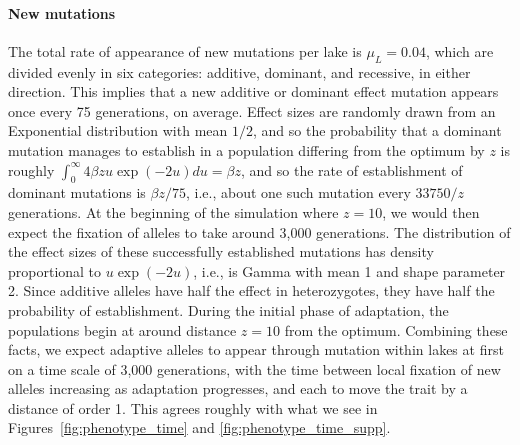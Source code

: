 \documentclass{article}
\begin{document}
\paragraph{New mutations}
The total rate of appearance of new mutations per lake is $\mu_L = 0.04$, 
which are divided evenly in six categories: additive, dominant, and recessive, in either direction. 
This implies that a new additive or dominant effect mutation appears once every 75 generations, on average. 
Effect sizes are randomly drawn from an Exponential distribution with mean $1/2$, 
and so the probability that a dominant mutation manages to establish in a population differing from the optimum by $z$ 
is roughly $\int_0^\infty 4 \beta z u \exp(-2u) du = \beta z$, 
and so the rate of establishment of dominant mutations is $\beta z / 75$, 
i.e., about one such mutation every $33750/z$ generations. 
At the beginning of the simulation where $z = 10$, we would then expect the fixation of alleles to take around 3,000 generations.
The distribution of the effect sizes of these successfully established mutations 
has density proportional to $u \exp(-2u)$, i.e., is Gamma with mean 1 and shape parameter 2. 
Since additive alleles have half the effect in heterozygotes, 
they have half the probability of establishment. 
During the initial phase of adaptation, the populations begin at around distance $z=10$ from the optimum. 
Combining these facts, we expect adaptive alleles to appear through mutation within lakes at first on a time scale of 3,000 generations, 
with the time between local fixation of new alleles increasing as adaptation progresses, and each to move the trait by a distance of order 1.
This agrees roughly with what we see in Figures~\ref{fig:phenotype_time} and \ref{fig:phenotype_time_supp}.
\end{document}
